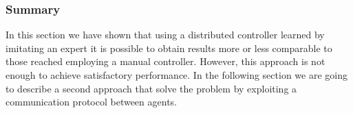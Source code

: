 \subsubsection{Summary}
\label{subsubsec:summary}
In this section we have shown that using a distributed controller learned by 
imitating an expert it is possible to obtain results more or less comparable to 
those reached employing a manual controller.
However, this approach is not enough to achieve satisfactory performance. In the 
following section we are going to describe a second approach that solve the 
problem by exploiting a communication protocol between agents.